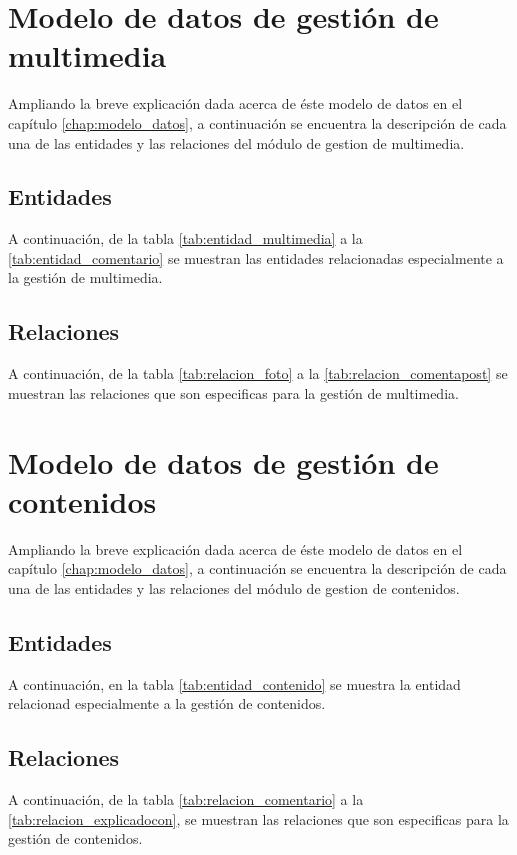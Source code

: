 \section{Modelo de datos de gestión de multimedia}
Ampliando la breve explicación dada acerca de éste modelo de datos en el capítulo \ref{chap:modelo_datos}, a continuación se encuentra la descripción de cada una de las entidades y las relaciones del módulo de gestion de multimedia.
\subsection{Entidades}
A continuación, de la tabla \ref{tab:entidad_multimedia} a la \ref{tab:entidad_comentario} se muestran las entidades relacionadas especialmente a la gestión de multimedia.





\subsection{Relaciones}
A continuación, de la tabla \ref{tab:relacion_foto} a la \ref{tab:relacion_comentapost} se muestran las relaciones que son especificas para la gestión de multimedia.






\section{Modelo de datos de gestión de contenidos}
Ampliando la breve explicación dada acerca de éste modelo de datos en el capítulo \ref{chap:modelo_datos}, a continuación se encuentra la descripción de cada una de las entidades y las relaciones del módulo de gestion de contenidos.
\subsection{Entidades}
A continuación, en la tabla \ref{tab:entidad_contenido}  se muestra la entidad relacionad especialmente a la gestión de contenidos.

\subsection{Relaciones}
A continuación, de la tabla \ref{tab:relacion_comentario} a la \ref{tab:relacion_explicadocon}, se muestran las relaciones que son especificas para la gestión de contenidos.


